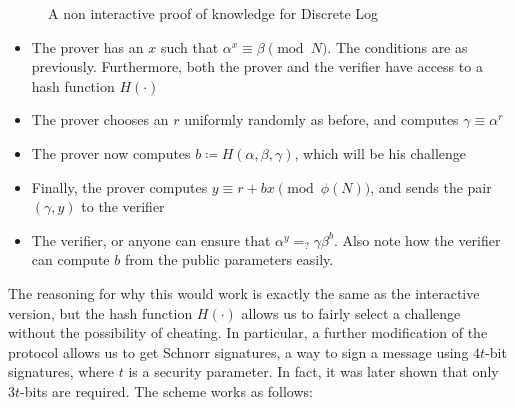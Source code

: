 \documentclass{article}
\begin{document}
\begin{figure}[H]
    \centering
    \caption{A non interactive proof of knowledge for Discrete Log}
    \label{discretelognoninteractive}
\end{figure}

\begin{itemize}
    \item The prover has an $x$ such that $\alpha^x \equiv \beta \pmod N$. The conditions are as previously.
          Furthermore, both the prover and the verifier have access to a hash function $H(\cdot)$
    \item The prover chooses an $r$ uniformly randomly as before, and computes $\gamma \equiv \alpha^r$
    \item The prover now computes $b \coloneqq H(\alpha, \beta, \gamma)$, which will be his challenge
    \item Finally, the prover computes $y \equiv r + bx \pmod{\phi(N)}$, and sends the pair $(\gamma, y)$ to the verifier
    \item The verifier, or anyone can ensure that $ \alpha^y =_? \gamma \beta^b$. Also note how the verifier can compute
          $b$ from the public parameters easily.
\end{itemize}

The reasoning for why this would work is exactly the same as the interactive version, but the hash function
$H(\cdot)$ allows us to fairly select a challenge without the possibility of cheating. In particular, a further
modification of the protocol allows us to get Schnorr signatures, a way to sign a message using $4t$-bit signatures,
where $t$ is a security parameter. In fact, it was later shown \cite{nevenHashFunctionRequirements2009} that only $3t$-bits
are required. The scheme works as follows:
\end{document}
